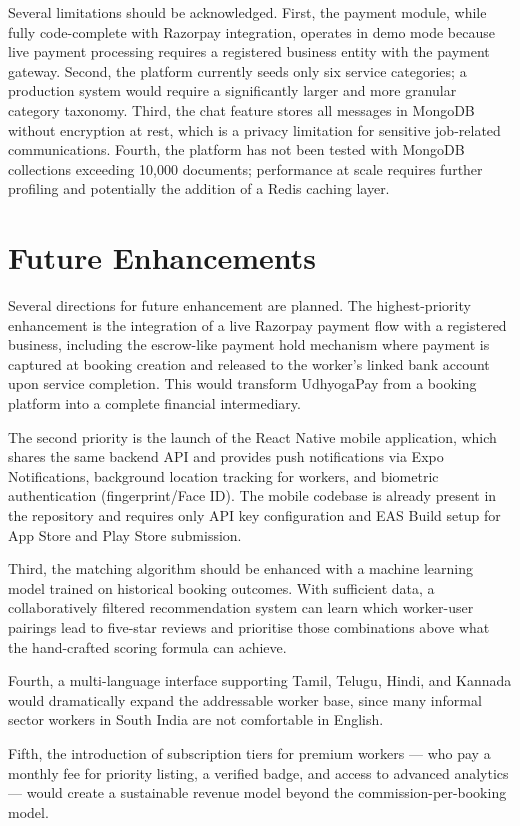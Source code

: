 \documentclass[12pt,a4paper]{report}
\begin{document}
Several limitations should be acknowledged. First, the payment module, while fully code-complete with Razorpay integration, operates in demo mode because live payment processing requires a registered business entity with the payment gateway. Second, the platform currently seeds only six service categories; a production system would require a significantly larger and more granular category taxonomy. Third, the chat feature stores all messages in MongoDB without encryption at rest, which is a privacy limitation for sensitive job-related communications. Fourth, the platform has not been tested with MongoDB collections exceeding 10,000 documents; performance at scale requires further profiling and potentially the addition of a Redis caching layer.

\section{Future Enhancements}

Several directions for future enhancement are planned. The highest-priority enhancement is the integration of a live Razorpay payment flow with a registered business, including the escrow-like payment hold mechanism where payment is captured at booking creation and released to the worker's linked bank account upon service completion. This would transform UdhyogaPay from a booking platform into a complete financial intermediary.

The second priority is the launch of the React Native mobile application, which shares the same backend API and provides push notifications via Expo Notifications, background location tracking for workers, and biometric authentication (fingerprint/Face ID). The mobile codebase is already present in the repository and requires only API key configuration and EAS Build setup for App Store and Play Store submission.

Third, the matching algorithm should be enhanced with a machine learning model trained on historical booking outcomes. With sufficient data, a collaboratively filtered recommendation system can learn which worker-user pairings lead to five-star reviews and prioritise those combinations above what the hand-crafted scoring formula can achieve.

Fourth, a multi-language interface supporting Tamil, Telugu, Hindi, and Kannada would dramatically expand the addressable worker base, since many informal sector workers in South India are not comfortable in English.

Fifth, the introduction of subscription tiers for premium workers — who pay a monthly fee for priority listing, a verified badge, and access to advanced analytics — would create a sustainable revenue model beyond the commission-per-booking model.
\end{document}
